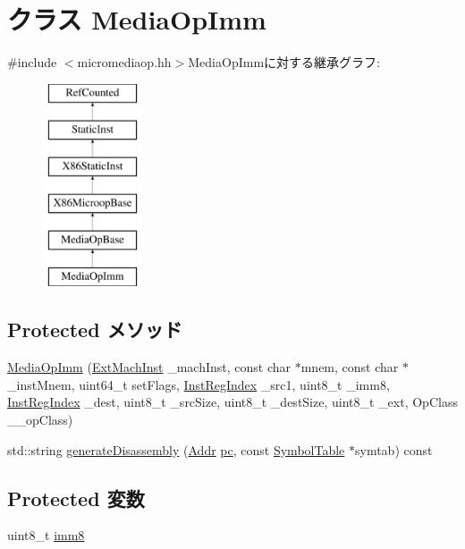 \hypertarget{classX86ISA_1_1MediaOpImm}{
\section{クラス MediaOpImm}
\label{classX86ISA_1_1MediaOpImm}
}


{\ttfamily \#include $<$micromediaop.hh$>$}MediaOpImmに対する継承グラフ:\begin{figure}[H]
\begin{center}
\leavevmode
\includegraphics[height=6cm]{classX86ISA_1_1MediaOpImm}
\end{center}
\end{figure}
\subsection*{Protected メソッド}
\begin{DoxyCompactItemize}
\item 
\hyperlink{classX86ISA_1_1MediaOpImm_a5e4cb19b40beae17fdf7aabcfe3456c4}{MediaOpImm} (\hyperlink{structX86ISA_1_1ExtMachInst}{ExtMachInst} \_\-machInst, const char $\ast$mnem, const char $\ast$\_\-instMnem, uint64\_\-t setFlags, \hyperlink{structX86ISA_1_1InstRegIndex}{InstRegIndex} \_\-src1, uint8\_\-t \_\-imm8, \hyperlink{structX86ISA_1_1InstRegIndex}{InstRegIndex} \_\-dest, uint8\_\-t \_\-srcSize, uint8\_\-t \_\-destSize, uint8\_\-t \_\-ext, OpClass \_\-\_\-opClass)
\item 
std::string \hyperlink{classX86ISA_1_1MediaOpImm_a95d323a22a5f07e14d6b4c9385a91896}{generateDisassembly} (\hyperlink{base_2types_8hh_af1bb03d6a4ee096394a6749f0a169232}{Addr} \hyperlink{namespaceX86ISA_aecb63c74e066ecd98e04d057e39028c9}{pc}, const \hyperlink{classSymbolTable}{SymbolTable} $\ast$symtab) const 
\end{DoxyCompactItemize}
\subsection*{Protected 変数}
\begin{DoxyCompactItemize}
\item 
uint8\_\-t \hyperlink{classX86ISA_1_1MediaOpImm_ad18c4c3d19022c71370c8724fc285c8f}{imm8}
\end{DoxyCompactItemize}


